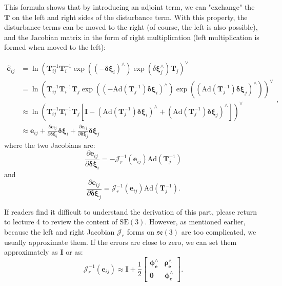 This formula shows that by introducing an adjoint term, we can "exchange" the $\bm{T}$ on the left and right sides of the disturbance term. With this property, the disturbance terms can be moved to the right (of course, the left is also possible), and the Jacobian matrix in the form of right multiplication (left multiplication is formed when moved to the left):

\begin{equation}
	\begin{aligned}
		\hat{ \bm{e}}_{ij} &= \ln \left( \bm{T}_{ij}^{-1}  \bm{T}_i^{-1} \exp((-\bm{\delta \xi}_i)^\wedge) \exp(\delta \bm{\xi}_j^\wedge) \bm{T}_j  \right)^\vee\\
		&= \ln \left( \bm{T}_{ij}^{-1} \bm{T}_i^{-1} \bm{T}_j \exp \left( \left(- \mathrm{Ad}(\bm{T}_j^{-1}) \bm{\delta \xi}_i \right)^\wedge \right) \exp \left( \left( \mathrm{Ad}(\bm{T}_j^{-1})  \bm{\delta\xi}_j\right)^\wedge \right) \right)^\vee \\ 
		&\approx \ln \left( \bm{T}_{ij}^{-1} \bm{T}_i^{-1} \bm{T}_j \left[ \bm{I} - (\mathrm{Ad}(\bm{T}_j^{-1}) \bm{\delta \xi}_i)^\wedge + (\mathrm{Ad}(\bm{T}_j^{-1})  \bm{\delta \xi}_j)^{\wedge} \right] \right)^\vee \\
		& \approx \bm{e}_{ij} + \frac{\partial \bm{e}_{ij}}{\partial \bm{\delta \xi}_i} \bm{\delta \xi}_i + \frac{\partial \bm{e}_{ij}}{\partial \bm{\delta \xi}_j} \bm{\delta \xi}_j
	\end{aligned},
\end{equation}
where the two Jacobians are:
\begin{equation}
	\frac{\partial \bm{e}_{ij}}{\partial \bm{\delta \xi}_i} = - \bm{\mathcal{J}}_r^{-1}(\bm{e}_{ij}) \mathrm{Ad}(\bm{T}_j^{-1}) 
\end{equation}
and
\begin{equation}
	\frac{\partial \bm{e}_{ij}}{\partial \bm{\delta \xi}_j} = \bm{\mathcal{J}}_r^{-1}(\bm{e}_{ij}) \mathrm{Ad}(\bm{T}_j^{-1}).
\end{equation}

If readers find it difficult to understand the derivation of this part, please return to lecture 4 to review the content of $\mathrm{SE}(3)$. However, as mentioned earlier, because the left and right Jacobian $\bm{\mathcal{J}}_r$ forms on $\mathfrak{se}(3)$ are too complicated, we usually approximate them. If the errors are close to zero, we can set them approximately as $\bm{I}$ or as:
\begin{equation}
	\bm{\mathcal{J}}_r^{-1}(\bm{e}_{ij}) \approx \bm{I} + \frac{1}{2} 
	\left[ 
	{\begin{array}{*{20}{c}}
			{{\bm{\phi}_{\bm{e}} ^ \wedge }}&{{\bm{\rho}_{\bm{e}} ^ \wedge }}\\
			{\bm{0}}&{{\bm{\phi}_{\bm{e}} ^ \wedge }}
	\end{array}} 
	\right].
\end{equation}

